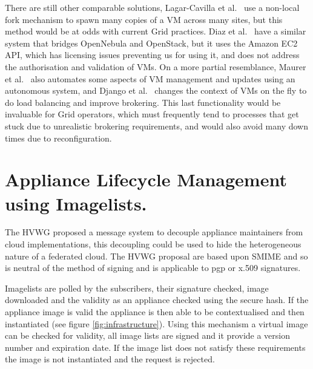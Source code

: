 \documentclass{llncs_Ibergrid2013}
\begin{document}
There are still other comparable solutions, Lagar-Cavilla et al.~\cite{Lagar-Cavilla2009} use a non-local fork mechanism to spawn many copies of a VM across many sites, but this method would be at odds with current Grid practices. Diaz et al.~\cite{Diaz2012} have a similar system that bridges OpenNebula and OpenStack, but it uses the Amazon EC2 API, which has licensing issues preventing us for using it, and does not address the authorisation and validation of VMs. On a more partial resemblance, Maurer et al.~\cite{Maurer2013} also automates some aspects of VM management and updates using an autonomous system, and Django et al.~\cite{Django2013} changes the context of VMs on the fly to do load balancing and improve brokering. This last functionality would be invaluable for Grid operators, which must frequently tend to processes that get stuck due to unrealistic brokering requirements, and would also avoid many down times due to reconfiguration.

\section{Appliance Lifecycle Management using Imagelists.}
\label{sect-appliancelifecycle}
The HVWG proposed a message system to decouple appliance maintainers from cloud implementations, this decoupling could be used to hide the heterogeneous nature of a federated cloud. The HVWG proposal are based upon SMIME and so is neutral of the method of signing and is applicable to pgp or x.509 signatures.

Imagelists are polled by the subscribers, their signature checked, image downloaded and the validity as an appliance checked using the secure hash. If the appliance image is valid the appliance is then able to be contextualised and then instantiated (see figure \ref{fig:infrastructure}). 
Using this mechanism a virtual image can be checked for validity, all image lists are signed and it provide a version number and expiration date. If the image list does not satisfy these requirements the image is not instantiated and the request is rejected.
\end{document}
